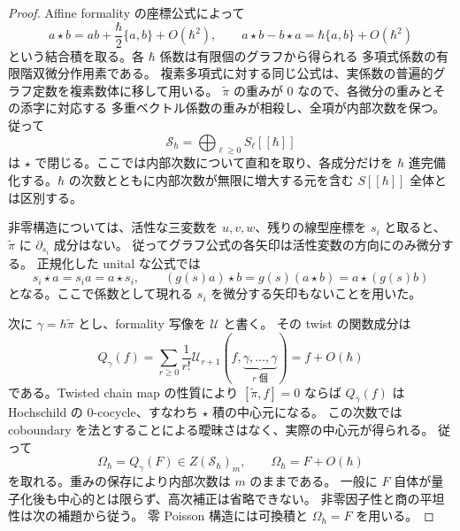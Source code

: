 \begin{proof}
Affine formality の座標公式によって
\begin{equation}
 a\star b=ab+\frac{\hbar}{2}\{a,b\}+O(\hbar^2),
 \qquad a\star b-b\star a=\hbar\{a,b\}+O(\hbar^2)
 \label{eq:star-first-order}
\end{equation}
という結合積を取る。各 $\hbar$ 係数は有限個のグラフから得られる
多項式係数の有限階双微分作用素である。
複素多項式に対する同じ公式は、実係数の普遍的グラフ定数を複素数体に移して用いる。
$\widetilde\pi$ の重みが $0$ なので、各微分の重みとその添字に対応する
多重ベクトル係数の重みが相殺し、全項が内部次数を保つ。
従って
\begin{equation}
 \mathcal S_\hbar=\bigoplus_{\ell\geq0}S_\ell[[\hbar]]
 \label{eq:graded-formal-ambient}
\end{equation}
は $\star$ で閉じる。ここでは内部次数について直和を取り、各成分だけを
$\hbar$ 進完備化する。$\hbar$ の次数とともに内部次数が無限に増大する元を含む
$S[[\hbar]]$ 全体とは区別する。

非零構造については、活性な三変数を $u,v,w$、残りの線型座標を $s_i$ と取ると、
$\widetilde\pi$ に $\partial_{s_i}$ 成分はない。
従ってグラフ公式の各矢印は活性変数の方向にのみ微分する。
正規化した unital な公式では
\begin{equation}
 s_i\star a=s_i a=a\star s_i,
 \qquad
 (g(s)a)\star b=g(s)(a\star b)=a\star(g(s)b)
 \label{eq:exact-central-parameters}
\end{equation}
となる。ここで係数として現れる $s_i$ を微分する矢印もないことを用いた。

次に $\gamma=\hbar\widetilde\pi$ とし、formality 写像を $\mathcal U$ と書く。
その twist の関数成分は
\begin{equation}
 Q_\gamma(f)=\sum_{r\geq0}\frac{1}{r!}
   \mathcal U_{r+1}(f,\underbrace{\gamma,\ldots,\gamma}_{r\text{ 個}})
 =f+O(\hbar)
 \label{eq:twisted-central-map}
\end{equation}
である。Twisted chain map の性質により $[\widetilde\pi,f]=0$ ならば
$Q_\gamma(f)$ は Hochschild の $0$-cocycle、すなわち $\star$ 積の中心元になる。
この次数では coboundary を法とすることによる曖昧さはなく、実際の中心元が得られる。
従って
\begin{equation}
 \Omega_\hbar=Q_\gamma(F)\in Z(\mathcal S_\hbar)_m,
 \qquad \Omega_\hbar=F+O(\hbar)
 \label{eq:central-equation}
\end{equation}
を取れる。重みの保存により内部次数は $m$ のままである。
一般に $F$ 自体が量子化後も中心的とは限らず、高次補正は省略できない。
非零因子性と商の平坦性は次の補題から従う。
零 Poisson 構造には可換積と $\Omega_\hbar=F$ を用いる。
\end{proof}

